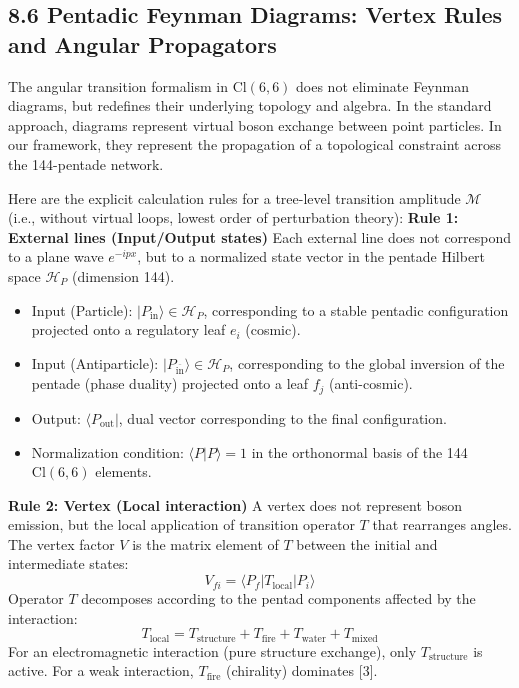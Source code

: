 \documentclass[11pt]{article}
\providecommand{\tightlist}{\setlength{\itemsep}{2pt}\setlength{\parskip}{6pt}}
\let\oldmathcal\mathcal
\renewcommand{\mathcal}[1]{\oldmathcal{#1}}
\providecommand{\tightlist}{%
  \setlength{\itemsep}{2pt}\setlength{\parskip}{6pt}
}
\begin{document}
\hypertarget{pentadic-feynman-diagrams-vertex-rules-and-angular-propagators}{%
\subsection{8.6 Pentadic Feynman Diagrams: Vertex Rules and Angular
Propagators}\label{pentadic-feynman-diagrams-vertex-rules-and-angular-propagators}}

The angular transition formalism in \(\text{Cl}(6,6)\) does not
eliminate Feynman diagrams, but redefines their underlying topology and
algebra. In the standard approach, diagrams represent virtual boson
exchange between point particles. In our framework, they represent the
propagation of a topological constraint across the 144-pentade network.

Here are the explicit calculation rules for a tree-level transition
amplitude \(\mathcal{M}\) (i.e., without virtual loops, lowest order of
perturbation theory): \textbf{Rule 1: External lines (Input/Output
states)} Each external line does not correspond to a plane wave
\(e^{-ipx}\), but to a normalized state vector in the pentade Hilbert
space \(\mathcal{H}_P\) (dimension 144).

\begin{itemize}
\tightlist
\item
  Input (Particle): \(|P_{\text{in}}\rangle \in \mathcal{H}_P\),
  corresponding to a stable pentadic configuration projected onto a
  regulatory leaf \(e_i\) (cosmic).
\item
  Input (Antiparticle):
  \(|P_{\overline{\text{in}}}\rangle \in \mathcal{H}_P\), corresponding
  to the global inversion of the pentade (phase duality) projected onto
  a leaf \(f_j\) (anti-cosmic).
\item
  Output: \(\langle P_{\text{out}}|\), dual vector corresponding to the
  final configuration.
\item
  Normalization condition: \(\langle P | P \rangle = 1\) in the
  orthonormal basis of the 144 \(\text{Cl}(6,6)\) elements.
\end{itemize}

\textbf{Rule 2: Vertex (Local interaction)} A vertex does not represent
boson emission, but the local application of transition operator \(T\)
that rearranges angles. The vertex factor \(V\) is the matrix element of
\(T\) between the initial and intermediate states: \[
V_{fi} = \langle P_f | T_{\text{local}} | P_i \rangle
\] Operator \(T\) decomposes according to the pentad components affected
by the interaction: \[
T_{\text{local}} = T_{\text{structure}} + T_{\text{fire}} + T_{\text{water}} + T_{\text{mixed}}
\] For an electromagnetic interaction (pure structure exchange), only
\(T_{\text{structure}}\) is active. For a weak interaction,
\(T_{\text{fire}}\) (chirality) dominates {[}3{]}.
\end{document}
